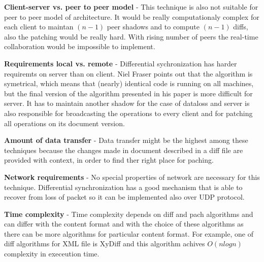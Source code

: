\documentclass[12pt,oneside]{fithesis2}
\begin{document}
\vspace{3mm}

\par \textbf{\underline{}}

\vspace{3mm}

\textbf{Client-server vs. peer to peer model} - This technique is also not suitable for peer to peer model of architecture. It would be really computationaly complex for each client to maintan \((n-1)\) peer shadows and to compute \((n-1)\) diffs, also the patching would be really hard. With rising number of peers the real-time collaboration would be impossible to implement.

\vspace{3mm}

\textbf{Requirements local vs. remote} - Differential sychronization has harder requiremts on server than on client. Niel Fraser \cite{Fraser} points out that the algorithm is symetrical, which means that (nearly) identical code is running on all machines, but the final version of the algorithm presented in his paper is more difficult for server. It has to maintain another shadow for the case of dataloss and server is also responsible for broadcasting the operations to every client and for patching all operations on its document version.

\vspace{3mm}

\textbf{Amount of data transfer} - Data transfer might be the highest among these techniques because the changes made in document described in a diff file are provided with context, in order to find ther right place for paching.

\vspace{3mm}

\textbf{Network requirements} - No special properties of network are necessary for this technique. Differential synchronization has a good mechanism that is able to recover from loss of packet so it can be implemented also over UDP protocol.

\vspace{3mm}

\textbf{Time complexity} - Time complexity depends on diff and pach algorithms and can differ with the content format and with the choice of these algorithms as there can be more algorithms for particular content format. For example, one of diff algorithms for XML file is XyDiff\cite{Xdiff} and this algorithm achives \(O(nlogn)\) complexity in execeution time.
\end{document}
